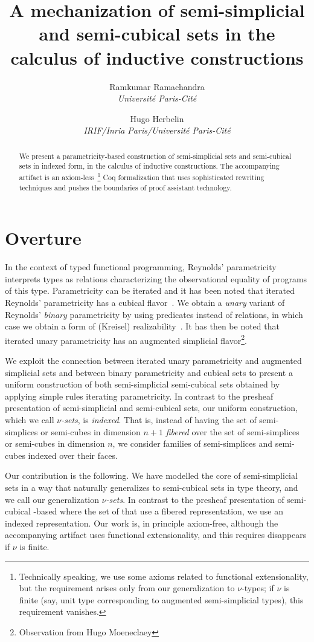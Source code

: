 \documentclass[10pt]{art.cls/art}
\title{A mechanization of semi-simplicial and semi-cubical sets in the calculus of inductive constructions}
\author{
  \textcolor{gray80}{Ramkumar Ramachandra} \\
  \itshape \textcolor{gray80}{Université Paris-Cité}
  \and
  \textcolor{gray80}{Hugo Herbelin} \\
  \itshape \textcolor{gray80}{IRIF/Inria Paris/Université Paris-Cité}
}
\date{}
\begin{document}
\thispagestyle{empty}
\maketitle
\begin{abstract}
  We present a parametricity-based construction of semi-simplicial sets and semi-cubical sets in indexed form, in the calculus of inductive constructions. The accompanying artifact is an axiom-less~\footnote{Technically speaking, we use some axioms related to functional extensionality, but the requirement arises only from our generalization to $\nu$-types; if $\nu$ is finite (say, unit type corresponding to augmented semi-simplicial types), this requirement vanishes.} Coq formalization that uses sophisticated rewriting techniques and pushes the boundaries of proof assistant technology.
\end{abstract}
\tableofcontents
\newpage

\section{Overture}

In the context of typed functional programming, Reynolds' parametricity~\cite{} interprets types as relations characterizing the observational equality of programs of this type. Parametricity can be iterated and it has been noted that iterated Reynolds' parametricity has a cubical flavor~\cite{}. We obtain a \emph{unary} variant of Reynolds' \emph{binary} parametricity by using predicates instead of relations, in which case we obtain a form of (Kreisel) realizability~\cite{}. It has then be noted that iterated unary parametricity has an augmented simplicial flavor\footnote{Observation from Hugo Moeneclaey}.

We exploit the connection between iterated unary parametricity and augmented simplicial sets and between binary parametricity and cubical sets to present a uniform construction of both semi-simplicial semi-cubical sets obtained by applying simple rules iterating parametricity.  In contrast to the presheaf presentation of semi-simplicial and semi-cubical sets, our uniform construction, which we call \emph{$\nu$-sets}, is \emph{indexed}. That is, instead of having the set of semi-simplices or semi-cubes in dimension $n+1$
\emph{fibered} over the set of semi-simplices or semi-cubes in dimension $n$, we consider families of semi-simplices and semi-cubes indexed over their faces.

\iffalse
Our contribution is the following. We have modelled the core of semi-simplicial sets in a way that naturally generalizes to semi-cubical sets in type theory, and we call our generalization \emph{$\nu$-sets}. In contrast to the presheaf presentation of semi-cubical -based where the set of  that use a fibered representation, we use an indexed representation. Our work is, in principle axiom-free, although the accompanying artifact uses functional extensionality, and this requires disappears if $\nu$ is finite.
\end{document}

